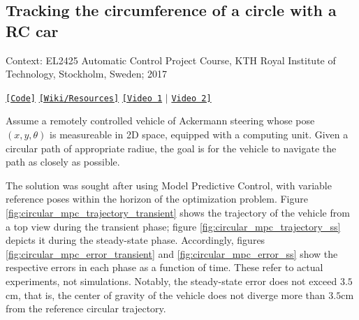 \subsection{Tracking the circumference of a circle with a RC car}

Context: EL2425 Automatic Control Project Course, KTH Royal Institute of
Technology, Stockholm, Sweden; 2017

\noindent \href{https://github.com/li9i/HT16_P2_EL2425}{\texttt{[Code]}} \href{https://github.com/li9i/HT16_P2_EL2425_resources}{\texttt{[Wiki/Resources]}} \href{https://www.youtube.com/watch?v=Vh1huYlyD_8}{\texttt{[Video 1}} $|$ \href{https://youtu.be/937OZez1iN8?t=69}{\texttt{Video 2]}} \\


\begin{problem}
Assume a remotely controlled vehicle of Ackermann steering whose pose
$(x,y,\theta)$ is measureable in 2D space, equipped with a computing unit.
Given a circular path of appropriate radiue, the goal is for the vehicle to
navigate the path as closely as possible.
\end{problem}

The solution was sought after using Model Predictive Control, with variable
reference poses within the horizon of the optimization problem. Figure
\ref{fig:circular_mpc_trajectory_transient} shows the trajectory of the vehicle
from a top view during the transient phase; figure
\ref{fig:circular_mpc_trajectory_ss} depicts it during the steady-state phase.
Accordingly, figures \ref{fig:circular_mpc_error_transient} and
\ref{fig:circular_mpc_error_ss} show the respective errors in each phase as a
function of time. These refer to actual experiments, not simulations.  Notably,
the steady-state error does not exceed $3.5$cm, that is, the center of gravity
of the vehicle does not diverge more than $3.5$cm from the reference circular
trajectory.

\noindent{}


